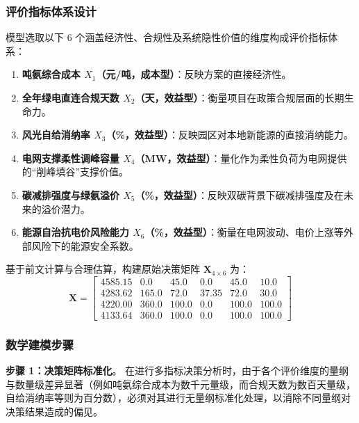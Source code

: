 \subsubsection{评价指标体系设计}

模型选取以下 6 个涵盖经济性、合规性及系统隐性价值的维度构成评价指标体系：
\begin{enumerate}
    \item \textbf{吨氨综合成本 $X_1$（元/吨，成本型）}：反映方案的直接经济性。
    \item \textbf{全年绿电直连合规天数 $X_2$（天，效益型）}：衡量项目在政策合规层面的长期生命力。
    \item \textbf{风光自给消纳率 $X_3$（\%，效益型）}：反映园区对本地新能源的直接消纳能力。
    \item \textbf{电网支撑柔性调峰容量 $X_4$（MW，效益型）}：量化作为柔性负荷为电网提供的“削峰填谷”支撑价值。
    \item \textbf{碳减排强度与绿氨溢价 $X_5$（\%，效益型）}：反映双碳背景下碳减排强度及在未来的溢价潜力。
    \item \textbf{能源自治抗电价风险能力 $X_6$（\%，效益型）}：衡量在电网波动、电价上涨等外部风险下的能源安全系数。
\end{enumerate}

基于前文计算与合理估算，构建原始决策矩阵 $\mathbf{X}_{4 \times 6}$ 为：
\begin{equation}
\mathbf{X} = \begin{bmatrix}
4585.15 & 0.0 &   45.0 &  0.0  & 45.0 &  10.0 \\
4283.62 & 165.0 & 72.0 &  37.35 & 72.0 &  30.0 \\
4220.00 & 360.0 & 100.0 & 0.0  & 100.0 & 100.0 \\
4133.64 & 360.0 & 100.0 & 0.0  & 100.0 & 100.0 
\end{bmatrix}
\end{equation}

\subsubsection{数学建模步骤}

\textbf{步骤 1：决策矩阵标准化}。
在进行多指标决策分析时，由于各个评价维度的量纲与数量级差异显著（例如吨氨综合成本为数千元量级，而合规天数为数百天量级，自给消纳率等则为百分数），必须对其进行无量纲标准化处理，以消除不同量纲对决策结果造成的偏见。

